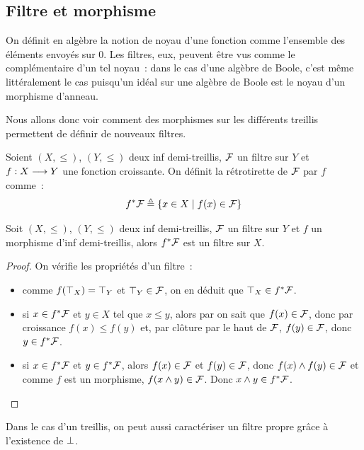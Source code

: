 \subsection{Filtre et morphisme}

On définit en algèbre la notion de noyau d'une fonction comme l'ensemble des
éléments envoyés sur $0$. Les filtres, eux, peuvent être vus comme le
complémentaire d'un tel noyau~: dans le cas d'une algèbre de Boole, c'est même
littéralement le cas puisqu'un idéal sur une algèbre de Boole est le noyau d'un
morphisme d'anneau.

Nous allons donc voir comment des morphismes sur les différents treillis
permettent de définir de nouveaux filtres.

\begin{definition}
  Soient $(X,\leq)$, $(Y,\leq)$ deux inf demi-treillis, $\mathcal{F}$ un filtre
  sur $Y$ et $f : \displaystyle X \longrightarrow Y$ une fonction croissante. On définit la
  rétrotirette de $\mathcal{F}$ par $f$ comme~:
  \[f^* \mathcal{F} \triangleq \left\{ x\in X \;\middle\vert\; f(x) \in \mathcal{F} \right\}\]
\end{definition}

\begin{property}
  Soit $(X,\leq)$, $(Y,\leq)$ deux inf demi-treillis, $\mathcal{F}$ un filtre
  sur $Y$ et $f$ un morphisme d'inf demi-treillis, alors $f^*\mathcal{F}$
  est un filtre sur $X$.
\end{property}

\begin{proof}
  On vérifie les propriétés d'un filtre~:
  \begin{itemize}
  \item comme $f(\top_X) = \top_Y$ et $\top_Y \in \mathcal{F}$, on en déduit que
    $\top_X\in f^*\mathcal{F}$.
  \item si $x\in f^*\mathcal{F}$ et $y\in X$ tel que $x\leq y$, alors par
    on sait que $f(x)\in\mathcal{F}$, donc par croissance $f(x)\leq f(y)$ et,
    par clôture par le haut de $\mathcal{F}$, $f(y)\in \mathcal{F}$, donc
    $y\in f^*\mathcal{F}$.
  \item si $x\in f^*\mathcal{F}$ et $y\in f^*\mathcal{F}$, alors
    $f(x)\in\mathcal{F}$ et $f(y)\in\mathcal{F}$, donc
    $f(x)\wedge f(y)\in\mathcal{F}$ et comme $f$ est un morphisme,
    $f(x\wedge y)\in\mathcal{F}$. Donc $x\wedge y\in f^*\mathcal{F}$.\qedhere
  \end{itemize}
\end{proof}

Dans le cas d'un treillis, on peut aussi caractériser un filtre propre grâce à
l'existence de $\bot$.

